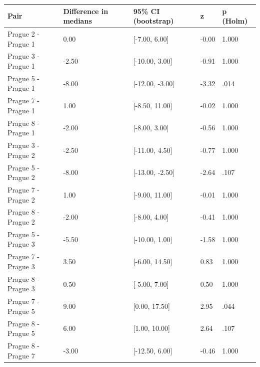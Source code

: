 \begin{tabular}{lllll}
  \toprule
Pair & Difference in medians & 95\% CI (bootstrap) & z & p (Holm) \\ 
  \midrule
Prague 2 - Prague 1 & 0.00 & [-7.00, 6.00] & -0.00 & 1.000 \\ 
  Prague 3 - Prague 1 & -2.50 & [-10.00, 3.00] & -0.91 & 1.000 \\ 
  Prague 5 - Prague 1 & -8.00 & [-12.00, -3.00] & -3.32 & .014 \\ 
  Prague 7 - Prague 1 & 1.00 & [-8.50, 11.00] & -0.02 & 1.000 \\ 
  Prague 8 - Prague 1 & -2.00 & [-8.00, 3.00] & -0.56 & 1.000 \\ 
  Prague 3 - Prague 2 & -2.50 & [-11.00, 4.50] & -0.77 & 1.000 \\ 
  Prague 5 - Prague 2 & -8.00 & [-13.00, -2.50] & -2.64 & .107 \\ 
  Prague 7 - Prague 2 & 1.00 & [-9.00, 11.00] & -0.01 & 1.000 \\ 
  Prague 8 - Prague 2 & -2.00 & [-8.00, 4.00] & -0.41 & 1.000 \\ 
  Prague 5 - Prague 3 & -5.50 & [-10.00, 1.00] & -1.58 & 1.000 \\ 
  Prague 7 - Prague 3 & 3.50 & [-6.00, 14.50] & 0.83 & 1.000 \\ 
  Prague 8 - Prague 3 & 0.50 & [-5.00, 7.00] & 0.50 & 1.000 \\ 
  Prague 7 - Prague 5 & 9.00 & [0.00, 17.50] & 2.95 & .044 \\ 
  Prague 8 - Prague 5 & 6.00 & [1.00, 10.00] & 2.64 & .107 \\ 
  Prague 8 - Prague 7 & -3.00 & [-12.50, 6.00] & -0.46 & 1.000 \\ 
   \bottomrule
\end{tabular}
